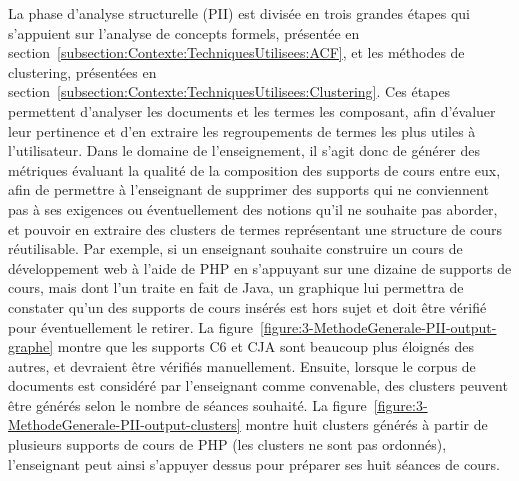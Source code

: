 La phase d'analyse structurelle (PII) est divisée en trois grandes étapes qui s'appuient sur l'analyse de concepts formels, présentée en section~\ref{subsection:Contexte:TechniquesUtilisees:ACF}, et les méthodes de clustering, présentées en section~\ref{subsection:Contexte:TechniquesUtilisees:Clustering}.
Ces étapes permettent d'analyser les documents et les termes les composant, afin d'évaluer leur pertinence et d'en extraire les regroupements de termes les plus utiles à l'utilisateur.
Dans le domaine de l'enseignement, il s'agit donc de générer des métriques évaluant la qualité de la composition des supports de cours entre eux, afin de permettre à l'enseignant de supprimer des supports qui ne conviennent pas à ses exigences ou éventuellement des notions qu'il ne souhaite pas aborder, et pouvoir en extraire des clusters de termes représentant une structure de cours réutilisable.
Par exemple, si un enseignant souhaite construire un cours de développement web à l'aide de PHP en s'appuyant sur une dizaine de supports de cours, mais dont l'un traite en fait de Java, un graphique lui permettra de constater qu'un des supports de cours insérés est hors sujet et doit être vérifié pour éventuellement le retirer.
La figure~\ref{figure:3-MethodeGenerale-PII-output-graphe} montre que les supports C6 et CJA sont beaucoup plus éloignés des autres, et devraient être vérifiés manuellement.
Ensuite, lorsque le corpus de documents est considéré par l'enseignant comme convenable, des clusters peuvent être générés selon le nombre de séances souhaité.
La figure~\ref{figure:3-MethodeGenerale-PII-output-clusters} montre huit clusters générés à partir de plusieurs supports de cours de PHP (les clusters ne sont pas ordonnés), l'enseignant peut ainsi s'appuyer dessus pour préparer ses huit séances de cours.

